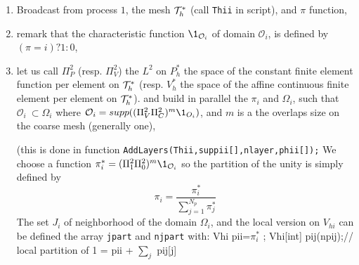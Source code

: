 \documentclass[a4paper,twoside,12pt]{book}
\begin{document}
\begin{enumerate}
\item Broadcast from process $1$, the mesh  $\mathcal{T}_{h}^*$ (call \texttt{Thii} in \freefempp script), and $\pi$ function,
\item remark that the characteristic function  $\1_{\mathcal{O}_i}$ of domain $\mathcal{O}_i$,   is defined  by $(\pi=i) ? 1 : 0 $, 
\item let us call $\Pi^2_P$ (resp. $\Pi^2_V$) the $L^2$ on $P_h^*$ the space of the constant finite element function per element on $\mathcal{T}_{h}^*$ (resp.
$V_h^*$ the space of the affine continuous finite element per element on $\mathcal{T}_{h}^*$).
and build in parallel the  $\pi_i$ and $\Omega_i$, such that   $ \mathcal{O}_i\ \subset \Omega_i$  where
 $ \mathcal{O}_i= supp ( (\Pi^2_V \Pi^2_C)^m \1_{O_i} )$, 
 and $m$ is a the overlaps size on the coarse mesh (generally one),
 
  (this is done in function \verb!AddLayers(Thii,suppii[],nlayer,phii[]);!
  We choose a function $\pi^*_i = (\Pi^2_1 \Pi^2_0)^m \1_{\mathcal{O}_i}   $ 
 so the partition of the unity is simply defined by
 \begin{equation}
  \pi_i = \frac{\pi_i^*}{\sum_{j=1}^{N_p} \pi_j^*} 
\end{equation}
 The set $J_i$ of  neighborhood of the domain $\Omega_i$, and the local version on $V_{hi}$  can be defined  the array \texttt{jpart} and \texttt{njpart} with:
 \def\piff,#1{$\pi^*_#1$}\smallskip
 \bFF 
      Vhi pii=\piff,i ;  Vhi[int] pij(npij);// local partition of 1 = pii + $\sum_j$ pij[j]  
       

\end{enumerate}
\end{document}
